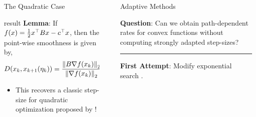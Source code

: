\documentclass[12pt, usenames, dvipsnames]{beamer}
\newlength{\sepwidth}
\newlength{\colwidth}
\newcommand{\separatorcolumn}{\begin{column}{\sepwidth}\end{column}}
\newcommand{\bad}[1]{\textcolor{bad}{#1}}
\newcommand{\good}[1]{\textcolor{CBBlue}{#1}}
\newcommand{\horizontalrule}{
	{
			\vspace{-0.5em}
            \begin{center}
			\rule{0.6\textwidth}{0.1em}
            \end{center}
			\vspace{-0.2em}
		}
}
\begin{document}
\begin{frame}[t]
\begin{columns}[t]
\begin{column}{\colwidth}
\begin{block}{The Quadratic Case}
                \begin{beamercolorbox}[wd=\textwidth,sep=1em]{result}
                    \textbf{Lemma}: If \( f(x) = \frac 1 2 x^\top B x - c^\top x \),
                    then the point-wise smoothness is given by,
                    {\Large
                            \[
                                D(x_k, x_{k+1}(\eta_k))
                                = \frac{\left\|B \nabla f(x_k)\right\|_2}{\left\|\nabla f(x_k)\right\|_2}.
                            \]
                        }
                \end{beamercolorbox}
                \vspace{-1.0ex}
                \begin{itemize}
                    \Large
                    \item This recovers a \good{classic step-size} for quadratic
                          optimization proposed by \citet{dai2006computational}!
                \end{itemize}
            \end{block}
        \end{column}

        \separatorcolumn

        \begin{column}{\colwidth}

            \begin{block}{Adaptive Methods}
                \vspace{-.25ex}
                \begin{center}
                    {\Large
                        \textbf{Question}: Can we obtain \good{path-dependent
                        rates} for convex functions without computing
                        \bad{strongly adapted step-sizes}?
                    }
                \end{center}
                \vspace{-1.5ex}

                \horizontalrule

                {\Large
                    \textbf{First Attempt}: Modify exponential search \citep{yair2022parameter}.
                }
                \vspace{0.25ex}


\end{block}
\end{column}
\end{columns}
\end{frame}
\end{document}
